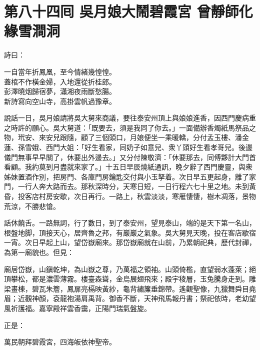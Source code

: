 
\chapter*{第八十四囘 吳月娘大鬧碧霞宮 曾靜師化緣雪澗洞}


詩曰：

\begin{myquote}
一自當年折鳳凰，至今情緒幾惶惶。\\蓋棺不作橫金婦，入地還從折桂郎。\\彭澤曉烟歸宿夢，瀟湘夜雨斷愁腸。\\新詩寫向空山寺，高掛雲帆過豫章。
\end{myquote}

說話一日，吳月娘請將吳大舅來商議，要往泰安州頂上與娘娘進香，因西門慶病重之時許的願心。吳大舅道：「既要去，須是我同了你去。」一面備辦香燭紙馬祭品之物，玳安、來安兒跟隨，顧了三個頭口，月娘便坐一乘暖轎，分付孟玉樓、潘金蓮、孫雪娥、西門大姐：「好生看家，同奶子如意兒、衆丫頭好生看孝哥兒。後邊儀門無事早早關了，休要出外邊去。」又分付陳敬濟：「休要那去，同傅夥計大門首看顧。我約莫到月盡就來家了。」{}十五日早辰燒紙通訊，晚夕辭了西門慶靈，與衆姊妹置酒作別，把房門、各庫門房鑰匙交付與小玉拏着。次日早五更起身，離了家門，一行人奔大路而去。那秋深時分，天寒日短，一日行程六七十里之地。未到黃昏，投客店村房安歇，次日再行。一路上，秋雲淡淡，寒雁悽悽，樹木凋落，景物荒涼，不勝悲愴。

話休饒舌。一路無詞，行了數日，到了泰安州，望見泰山，端的是天下第一名山，根盤地脚，頂接天心，居齊魯之邦，有巖巖之氣象。吳大舅見天晚，投在客店歇宿一宵。次日早起上山，望岱嶽廟來。那岱嶽廟就在山前，乃累朝祀典，歷代封禪，為第一廟貌也。但見：

\begin{myquote}
廟居岱嶽，山鎭乾坤，為山嶽之尊，乃萬福之領袖。山頭倚檻，直望弱水蓬萊；絕頂攀松，都是濃雲薄霧。樓臺森聳，金烏展翅飛來；殿宇稜層，玉兔騰身走到。雕梁畫棟，碧瓦朱簷，鳳扉亮槅映黃紗，龜背繡簾垂錦帶。遙觀聖像，九獵舞舜目堯眉；近觀神顏，袞龍袍湯肩禹背。御香不斷，天神飛馬報丹書；祭祀依時，老幼望風祈護福。嘉寧殿祥雲香靄，正陽門瑞氣盤旋。
\end{myquote}

正是：

\begin{myquote}
萬民朝拜碧霞宮，四海皈依神聖帝。
\end{myquote}

